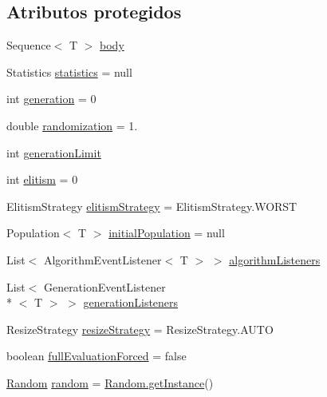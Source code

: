 \subsection*{Atributos protegidos}
\begin{DoxyCompactItemize}
\item 
Sequence$<$ T $>$ \hyperlink{classjenes_1_1_genetic_algorithm_3_01_t_01extends_01_chromosome_01_4_a0040f9dbb0018e8bb28dde97dacac7d8}{body}
\item 
Statistics \hyperlink{classjenes_1_1_genetic_algorithm_3_01_t_01extends_01_chromosome_01_4_afc23d5cbab5434f5ec5684cda9434b93}{statistics} = null
\item 
int \hyperlink{classjenes_1_1_genetic_algorithm_3_01_t_01extends_01_chromosome_01_4_ac5a1ddc5e78e2b81c754eb990a91f17b}{generation} = 0
\item 
double \hyperlink{classjenes_1_1_genetic_algorithm_3_01_t_01extends_01_chromosome_01_4_adcb3e16398451c2e318de21d77b51d35}{randomization} = 1.
\item 
int \hyperlink{classjenes_1_1_genetic_algorithm_3_01_t_01extends_01_chromosome_01_4_a6677c80cf6ad470a0124fc2fa3051310}{generation\-Limit}
\item 
int \hyperlink{classjenes_1_1_genetic_algorithm_3_01_t_01extends_01_chromosome_01_4_ac4280b01e7da0ddc049050b19e28b8b9}{elitism} = 0
\item 
Elitism\-Strategy \hyperlink{classjenes_1_1_genetic_algorithm_3_01_t_01extends_01_chromosome_01_4_aacba3e1823ba66a2dd6d3c902f8ff719}{elitism\-Strategy} = Elitism\-Strategy.\-W\-O\-R\-S\-T
\item 
Population$<$ T $>$ \hyperlink{classjenes_1_1_genetic_algorithm_3_01_t_01extends_01_chromosome_01_4_ab6535da7a5097e18e6305d0f26f7cf5f}{initial\-Population} = null
\item 
List$<$ Algorithm\-Event\-Listener$<$ T $>$ $>$ \hyperlink{classjenes_1_1_genetic_algorithm_3_01_t_01extends_01_chromosome_01_4_a53540867ddd13889614232b3cbea6d6f}{algorithm\-Listeners}
\item 
List$<$ Generation\-Event\-Listener\\*
$<$ T $>$ $>$ \hyperlink{classjenes_1_1_genetic_algorithm_3_01_t_01extends_01_chromosome_01_4_a265c4e10d321e68ae5757abf68d88739}{generation\-Listeners}
\item 
Resize\-Strategy \hyperlink{classjenes_1_1_genetic_algorithm_3_01_t_01extends_01_chromosome_01_4_a56f08a1d1f3355921b83f08745dbb3b3}{resize\-Strategy} = Resize\-Strategy.\-A\-U\-T\-O
\item 
boolean \hyperlink{classjenes_1_1_genetic_algorithm_3_01_t_01extends_01_chromosome_01_4_adb627d0c6d6744f53ef5c3b7506913e9}{full\-Evaluation\-Forced} = false
\item 
\hyperlink{classjenes_1_1utils_1_1_random}{Random} \hyperlink{classjenes_1_1_genetic_algorithm_3_01_t_01extends_01_chromosome_01_4_a1579283e210144ba90b937be0911a028}{random} = \hyperlink{classjenes_1_1utils_1_1_random_aa8b8341f82ccf69de0b44c9f6f174820}{Random.\-get\-Instance}()
\end{DoxyCompactItemize}


